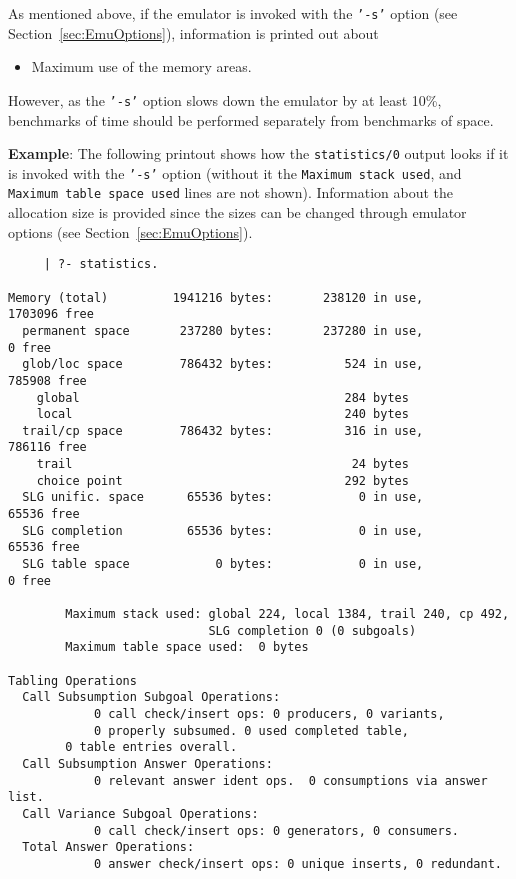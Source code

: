\begin{description}
    As mentioned above, if the emulator is invoked with the {\tt '-s'}
    option (see Section~\ref{sec:EmuOptions}), information is printed
    out about 
\begin{itemize} 
\item Maximum use of the memory areas.
\end{itemize} 
However, as the {\tt '-s'} option slows down the emulator by at least
10\%, benchmarks of time should be performed separately from
benchmarks of space.

{\bf Example}: The following printout shows how the {\tt statistics/0}
output looks if it is invoked with the {\tt '-s'} option (without it
the {\tt Maximum stack used}, and {\tt Maximum table space used} lines
are not shown).  Information about the allocation size is provided
since the sizes can be changed through emulator options (see
Section~\ref{sec:EmuOptions}).

    {\footnotesize
     \begin{verbatim}
     | ?- statistics.

Memory (total)         1941216 bytes:       238120 in use,      1703096 free
  permanent space       237280 bytes:       237280 in use,            0 free
  glob/loc space        786432 bytes:          524 in use,       785908 free
    global                                     284 bytes
    local                                      240 bytes
  trail/cp space        786432 bytes:          316 in use,       786116 free
    trail                                       24 bytes
    choice point                               292 bytes
  SLG unific. space      65536 bytes:            0 in use,        65536 free
  SLG completion         65536 bytes:            0 in use,        65536 free
  SLG table space            0 bytes:            0 in use,            0 free

        Maximum stack used: global 224, local 1384, trail 240, cp 492,
                            SLG completion 0 (0 subgoals)
        Maximum table space used:  0 bytes

Tabling Operations
  Call Subsumption Subgoal Operations:
            0 call check/insert ops: 0 producers, 0 variants,
            0 properly subsumed. 0 used completed table, 
	    0 table entries overall.
  Call Subsumption Answer Operations:
            0 relevant answer ident ops.  0 consumptions via answer list.
  Call Variance Subgoal Operations: 
            0 call check/insert ops: 0 generators, 0 consumers.
  Total Answer Operations: 
            0 answer check/insert ops: 0 unique inserts, 0 redundant.


\end{verbatim}}
\end{description}
